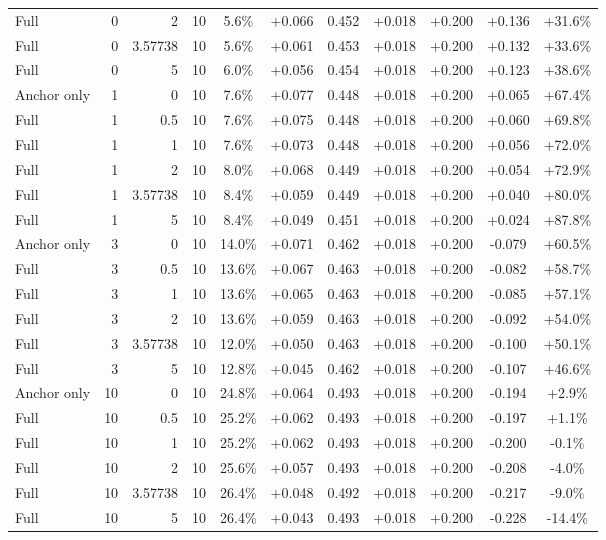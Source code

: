 \begin{table}[htbp]
\begin{tabular}{lrrrccccccc}
Full & 0 & 2 & 10 & 5.6\% & +0.066 & 0.452 & +0.018 & +0.200 & +0.136 & +31.6\% \\
Full & 0 & 3.57738 & 10 & 5.6\% & +0.061 & 0.453 & +0.018 & +0.200 & +0.132 & +33.6\% \\
Full & 0 & 5 & 10 & 6.0\% & +0.056 & 0.454 & +0.018 & +0.200 & +0.123 & +38.6\% \\
Anchor only & 1 & 0 & 10 & 7.6\% & +0.077 & 0.448 & +0.018 & +0.200 & +0.065 & +67.4\% \\
Full & 1 & 0.5 & 10 & 7.6\% & +0.075 & 0.448 & +0.018 & +0.200 & +0.060 & +69.8\% \\
Full & 1 & 1 & 10 & 7.6\% & +0.073 & 0.448 & +0.018 & +0.200 & +0.056 & +72.0\% \\
Full & 1 & 2 & 10 & 8.0\% & +0.068 & 0.449 & +0.018 & +0.200 & +0.054 & +72.9\% \\
Full & 1 & 3.57738 & 10 & 8.4\% & +0.059 & 0.449 & +0.018 & +0.200 & +0.040 & +80.0\% \\
Full & 1 & 5 & 10 & 8.4\% & +0.049 & 0.451 & +0.018 & +0.200 & +0.024 & +87.8\% \\
Anchor only & 3 & 0 & 10 & 14.0\% & +0.071 & 0.462 & +0.018 & +0.200 & -0.079 & +60.5\% \\
Full & 3 & 0.5 & 10 & 13.6\% & +0.067 & 0.463 & +0.018 & +0.200 & -0.082 & +58.7\% \\
Full & 3 & 1 & 10 & 13.6\% & +0.065 & 0.463 & +0.018 & +0.200 & -0.085 & +57.1\% \\
Full & 3 & 2 & 10 & 13.6\% & +0.059 & 0.463 & +0.018 & +0.200 & -0.092 & +54.0\% \\
Full & 3 & 3.57738 & 10 & 12.0\% & +0.050 & 0.463 & +0.018 & +0.200 & -0.100 & +50.1\% \\
Full & 3 & 5 & 10 & 12.8\% & +0.045 & 0.462 & +0.018 & +0.200 & -0.107 & +46.6\% \\
Anchor only & 10 & 0 & 10 & 24.8\% & +0.064 & 0.493 & +0.018 & +0.200 & -0.194 & +2.9\% \\
Full & 10 & 0.5 & 10 & 25.2\% & +0.062 & 0.493 & +0.018 & +0.200 & -0.197 & +1.1\% \\
Full & 10 & 1 & 10 & 25.2\% & +0.062 & 0.493 & +0.018 & +0.200 & -0.200 & -0.1\% \\
Full & 10 & 2 & 10 & 25.6\% & +0.057 & 0.493 & +0.018 & +0.200 & -0.208 & -4.0\% \\
Full & 10 & 3.57738 & 10 & 26.4\% & +0.048 & 0.492 & +0.018 & +0.200 & -0.217 & -9.0\% \\
Full & 10 & 5 & 10 & 26.4\% & +0.043 & 0.493 & +0.018 & +0.200 & -0.228 & -14.4\% \\

\end{tabular}
\end{table}
